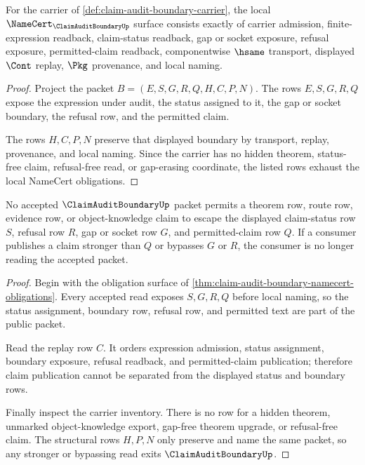 \begin{theorem}
\label{thm:claim-audit-boundary-namecert-obligations}
For the carrier of \autoref{def:claim-audit-boundary-carrier}, the local $\NameCert_{\ClaimAuditBoundaryUp}$ surface consists exactly of carrier admission, finite-expression readback, claim-status readback, gap or socket exposure, refusal exposure, permitted-claim readback, componentwise $\hsame$ transport, displayed $\Cont$ replay, $\Pkg$ provenance, and local naming.
\end{theorem}
\begin{proof}
Project the packet $B=(E,S,G,R,Q,H,C,P,N)$. The rows $E,S,G,R,Q$ expose the expression under audit, the status assigned to it, the gap or socket boundary, the refusal row, and the permitted claim.

The rows $H,C,P,N$ preserve that displayed boundary by transport, replay, provenance, and local naming. Since the carrier has no hidden theorem, status-free claim, refusal-free read, or gap-erasing coordinate, the listed rows exhaust the local NameCert obligations.
\end{proof}

\begin{theorem}
\label{thm:claim-audit-boundary-status-nonescape}
No accepted $\ClaimAuditBoundaryUp$ packet permits a theorem row, route row, evidence row, or object-knowledge claim to escape the displayed claim-status row $S$, refusal row $R$, gap or socket row $G$, and permitted-claim row $Q$. If a consumer publishes a claim stronger than $Q$ or bypasses $G$ or $R$, the consumer is no longer reading the accepted packet.
\end{theorem}
\begin{proof}
Begin with the obligation surface of \autoref{thm:claim-audit-boundary-namecert-obligations}. Every accepted read exposes $S,G,R,Q$ before local naming, so the status assignment, boundary row, refusal row, and permitted text are part of the public packet.

Read the replay row $C$. It orders expression admission, status assignment, boundary exposure, refusal readback, and permitted-claim publication; therefore claim publication cannot be separated from the displayed status and boundary rows.

Finally inspect the carrier inventory. There is no row for a hidden theorem, unmarked object-knowledge export, gap-free theorem upgrade, or refusal-free claim. The structural rows $H,P,N$ only preserve and name the same packet, so any stronger or bypassing read exits $\ClaimAuditBoundaryUp$.
\end{proof}

